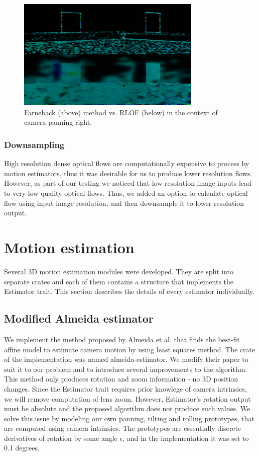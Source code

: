 \documentclass[11pt,english]{report}
\begin{document}
\begin{figure}[!ht]
	\centering
	\includegraphics[width=250pt]{docs/report/farneback-vs-rlof.jpg}
	\caption{\centering Farneback (above) method vs. RLOF (below) in the context of camera panning right.}
\end{figure}

\subsubsection{Downsampling}

High resolution dense optical flows are computationally expensive to process by motion estimators, thus it was desirable for us to produce lower resolution flows. However, as part of our testing we noticed that low resolution image inputs lead to very low quality optical flows. Thus, we added an option to calculate optical flow using input image resolution, and then downsample it to lower resolution output.

\section{Motion estimation}

Several 3D motion estimation modules were developed. They are split into separate crates and each of them contains a structure that implements the Estimator trait. This section describes the details of every estimator individually.

\subsection{Modified Almeida estimator}

We implement the method proposed by Almeida et al. that finds the best-fit affine model to estimate camera motion by using least squares method\cite{almeida}. The crate of the implementation was named almeida-estimator. We modify their paper to suit it to our problem and to introduce several improvements to the algorithm. This method only produces rotation and zoom information - no 3D position changes. Since the Estimator trait requires prior knowlege of camera intrinsics, we will remove computation of lens zoom. However, Estimator's rotation output must be absolute and the proposed algorithm does not produce such values. We solve this issue by modeling our own panning, tilting and rolling prototypes, that are computed using camera intrinsics. The prototypes are essentially discrete derivatives of rotation by some angle $\epsilon$, and in the implementation it was set to 0.1 degrees.
\end{document}
